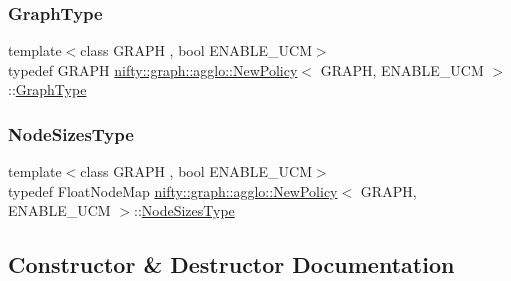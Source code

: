 \subsubsection{\texorpdfstring{Graph\+Type}{GraphType}}
{\footnotesize\ttfamily template$<$class G\+R\+A\+PH , bool E\+N\+A\+B\+L\+E\+\_\+\+U\+CM$>$ \\
typedef G\+R\+A\+PH \hyperlink{classnifty_1_1graph_1_1agglo_1_1NewPolicy}{nifty\+::graph\+::agglo\+::\+New\+Policy}$<$ G\+R\+A\+PH, E\+N\+A\+B\+L\+E\+\_\+\+U\+CM $>$\+::\hyperlink{classnifty_1_1graph_1_1agglo_1_1NewPolicy_ac8758b09604128d2bded40975109e808}{Graph\+Type}}

\mbox{\label{classnifty_1_1graph_1_1agglo_1_1NewPolicy_a77d4a9bba74fd8bd0adfae7058ce934e}} 
\subsubsection{\texorpdfstring{Node\+Sizes\+Type}{NodeSizesType}}
{\footnotesize\ttfamily template$<$class G\+R\+A\+PH , bool E\+N\+A\+B\+L\+E\+\_\+\+U\+CM$>$ \\
typedef Float\+Node\+Map \hyperlink{classnifty_1_1graph_1_1agglo_1_1NewPolicy}{nifty\+::graph\+::agglo\+::\+New\+Policy}$<$ G\+R\+A\+PH, E\+N\+A\+B\+L\+E\+\_\+\+U\+CM $>$\+::\hyperlink{classnifty_1_1graph_1_1agglo_1_1NewPolicy_a77d4a9bba74fd8bd0adfae7058ce934e}{Node\+Sizes\+Type}}



\subsection{Constructor \& Destructor Documentation}
\mbox{\label{classnifty_1_1graph_1_1agglo_1_1NewPolicy_abb73c71b6c9fd8038e323a56161cd52d}} 
